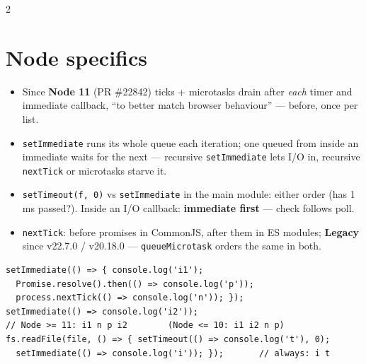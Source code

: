 \documentclass[8pt]{extarticle}
\newcommand\ct[1]{\texttt{#1}}
\begin{document}
\begin{multicols}{2}
\section{Node specifics}
\begin{itemize}
  \item Since \textbf{Node 11} (PR \#22842) ticks + microtasks drain after \emph{each} timer and
        immediate callback, ``to better match browser behaviour'' — before, once per list.
  \item \ct{setImmediate} runs its whole queue each iteration; one queued from inside an immediate
        waits for the next — recursive \ct{setImmediate} lets I/O in, recursive \ct{nextTick} or
        microtasks starve it.
  \item \ct{setTimeout(f, 0)} vs \ct{setImmediate} in the main module: either order (has 1\,ms
        passed?). Inside an I/O callback: \textbf{immediate first} — check follows poll.
  \item \ct{nextTick}: before promises in CommonJS, after them in ES modules; \textbf{Legacy}
        since v22.7.0 / v20.18.0 — \ct{queueMicrotask} orders the same in both.
\end{itemize}
\begin{lstlisting}[style=js]
setImmediate(() => { console.log('i1');
  Promise.resolve().then(() => console.log('p'));
  process.nextTick(() => console.log('n')); });
setImmediate(() => console.log('i2'));
// Node >= 11: i1 n p i2        (Node <= 10: i1 i2 n p)
fs.readFile(file, () => { setTimeout(() => console.log('t'), 0);
  setImmediate(() => console.log('i')); });       // always: i t
\end{lstlisting}


\end{multicols}
\end{document}
